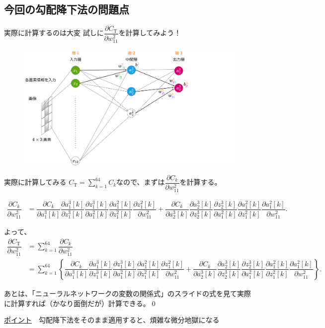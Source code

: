 \documentclass[dvipdfmx,aspectratio=169]{beamer}
\begin{document}
	\subsection{今回の勾配降下法の問題点}
	\begin{frame}{実際に計算するのは大変}
		試しに$ \dfrac{\partial C_\mathrm{T}}{\partial w^2_{11}} $を計算してみよう！
		\begin{figure}
			\centering
			\includegraphics[width=0.8\linewidth]{img/illustration-of-variable-and-parameter-names}
		\end{figure}
	\end{frame}
	\begin{frame}[allowframebreaks]{実際に計算してみる}
		$ C_\mathrm{T} = \displaystyle\sum_{k=1}^{64} C_k $なので、まずは$ \dfrac{\partial C_k}{\partial w^2_{11}} $を計算する。
		
		\begin{align*}
			\dfrac{\partial C_k}{\partial w^2_{11}} 
				&= \dfrac{\partial C_k}{\partial a^3_1[k]}\dfrac{\partial a^3_1[k]}{\partial z^3_1[k]}\dfrac{\partial z^3_1[k]}{\partial a^2_1[k]}\dfrac{\partial a^2_1[k]}{\partial z^2_1[k]}\dfrac{\partial z^2_1[k]}{\partial w^2_{11}}+\dfrac{\partial C_k}{\partial a^3_2[k]}\dfrac{\partial a^3_2[k]}{\partial z^3_2[k]}\dfrac{\partial z^3_2[k]}{\partial a^2_1[k]}\dfrac{\partial a^2_1[k]}{\partial z^2_1[k]}\dfrac{\partial a^2_1[k]}{\partial w^2_{11}}.
		\end{align*}
		
		よって、
		\begin{align*}
			\dfrac{\partial C_\mathrm{T}}{\partial w^2_{11}} 
				&= \sum_{k=1}^{64} \dfrac{\partial C_k}{\partial w^2_{11}}\\
				&= \sum_{k=1}^{64}\left\{ \dfrac{\partial C_k}{\partial a^3_1[k]}\dfrac{\partial a^3_1[k]}{\partial z^3_1[k]}\dfrac{\partial z^3_1[k]}{\partial a^2_1[k]}\dfrac{\partial a^2_1[k]}{\partial z^2_1[k]}\dfrac{\partial z^2_1[k]}{\partial w^2_{11}} + \dfrac{\partial C_k}{\partial a^3_2[k]}\dfrac{\partial a^3_2[k]}{\partial z^3_2[k]}\dfrac{\partial z^3_2[k]}{\partial a^2_1[k]}\dfrac{\partial a^2_1[k]}{\partial z^2_1[k]}\dfrac{\partial a^2_1[k]}{\partial w^2_{11}} \right\}.
		\end{align*}
	
		あとは、「ニューラルネットワークの変数の関係式」のスライドの式を見て実際に計算すれば（かなり面倒だが）計算できる。\qed
		\vspace{3em}
		
		\underline{ポイント}　勾配降下法をそのまま適用すると、煩雑な微分地獄になる		
	\end{frame}
\end{document}
